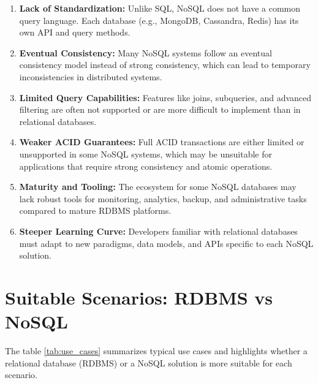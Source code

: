 \documentclass{article}
\begin{document}
\begin{enumerate}
    \item \textbf{Lack of Standardization:} Unlike SQL, NoSQL does not have a common query language. Each database (e.g., MongoDB, Cassandra, Redis) has its own API and query methods.

    \item \textbf{Eventual Consistency:} Many NoSQL systems follow an eventual consistency model instead of strong consistency, which can lead to temporary inconsistencies in distributed systems.

    \item \textbf{Limited Query Capabilities:} Features like joins, subqueries, and advanced filtering are often not supported or are more difficult to implement than in relational databases.

    \item \textbf{Weaker ACID Guarantees:} Full ACID transactions are either limited or unsupported in some NoSQL systems, which may be unsuitable for applications that require strong consistency and atomic operations.

    \item \textbf{Maturity and Tooling:} The ecosystem for some NoSQL databases may lack robust tools for monitoring, analytics, backup, and administrative tasks compared to mature RDBMS platforms.

    \item \textbf{Steeper Learning Curve:} Developers familiar with relational databases must adapt to new paradigms, data models, and APIs specific to each NoSQL solution.
\end{enumerate}

\section{Suitable Scenarios: RDBMS vs NoSQL}
The table \ref{tab:use_cases} summarizes typical use cases and highlights whether a relational database (RDBMS) or a NoSQL solution is more suitable for each scenario.
\end{document}
